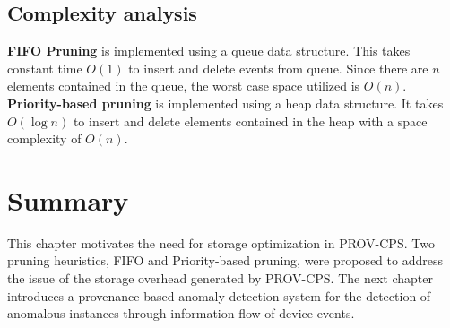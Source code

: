 \subsection{Complexity analysis}
\textbf{FIFO Pruning} is implemented using a queue data structure. This takes constant time $O(1)$ to insert and delete events from queue. Since there are $n$ elements contained in the queue, the worst case space utilized is $O(n)$. \textbf{Priority-based pruning} is implemented using a heap data structure. It takes $O(\log{}n)$ to insert and delete elements contained in the heap with a space complexity of $O(n)$.

\section{Summary}
This chapter motivates the need for storage optimization in PROV-CPS. Two pruning heuristics, FIFO and Priority-based pruning, were proposed to address the issue of the storage overhead generated by PROV-CPS. The next chapter introduces a provenance-based anomaly detection system for the detection of anomalous instances through information flow of device events. 


